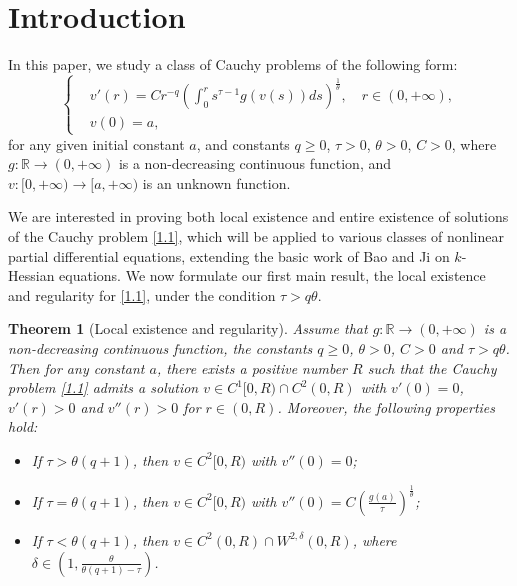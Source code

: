 \documentclass[a4paper,11pt]{amsart}
\theoremstyle{plain}
\newtheorem{Theorem}{Theorem}[section]
\theoremstyle{remark}
\numberwithin{equation}{section}
\numberwithin{figure}{section}
\numberwithin{remark}{section}
\begin{document}
\begin{sloppypar}
\section{Introduction}\label{Section 1}

\sloppy{}

In this paper, we study a class of Cauchy problems of the following form:
	\begin{equation}\label{1.1}
	\left\{
	\begin{aligned}
	&v'(r)= C  r^{-q}  \left(  \int_{0}^{r} s^{\tau-1} g (v(s))ds \right )^{\frac{1}{\theta}}, \quad r\in (0, +\infty), \\
	&v(0)=a,
	\end{aligned}
	\right.
	\end{equation}
for any given initial constant $a$, and constants $q\ge 0$, $\tau >0$, $\theta> 0$, $C>0$, where $g: \mathbb{R} \to (0,+\infty)$ is a non-decreasing continuous function, and $v: [0, +\infty) \to [a, +\infty)$ is an unknown function.

We are interested in proving both local existence and entire existence of solutions of the Cauchy problem \eqref{1.1}, which will be applied to various classes of nonlinear partial differential equations, extending the basic work of  Bao and Ji  \cite{JB2010} on $k$-Hessian equations. We now formulate our first main result, the local existence and regularity for \eqref{1.1}, under the condition $\tau > q\theta$.
\begin{Theorem}[Local existence and regularity]\label{Th 1.1}
Assume that $g: \mathbb{R} \to (0,+\infty)$ is a non-decreasing continuous function, the constants $q\ge 0$, $\theta> 0$, $C>0$ and $\tau > q\theta$. Then for any constant $a$, there exists a positive number $R$ such that the Cauchy problem \eqref{1.1} admits a solution $v \in C^1[0, R)\cap C^2(0, R)$ with $v'(0)=0$, $v'(r)>0$ and $v''(r)>0$ for $r\in (0, R)$.
Moreover, the following properties hold:
\begin{itemize}
\item[(i)] If $\tau> \theta (q+1)$, then $v\in C^2[0, R)$ with $v''(0)=0$; 

\item[(ii)] If $\tau= \theta (q+1)$, then $v\in C^2[0, R)$ with $v''(0)=C(\frac{g(a)}{\tau})^{\frac{1}{\theta}}$; 

\item[(iii)] If $\tau < \theta (q+1)$, then $v \in C^2(0, R)\cap W^{2, \delta}(0, R)$, where $\delta \in (1, \frac{\theta}{\theta (q+1)-\tau})$.
\end{itemize}
\end{Theorem}



\end{sloppypar}
\end{document}
